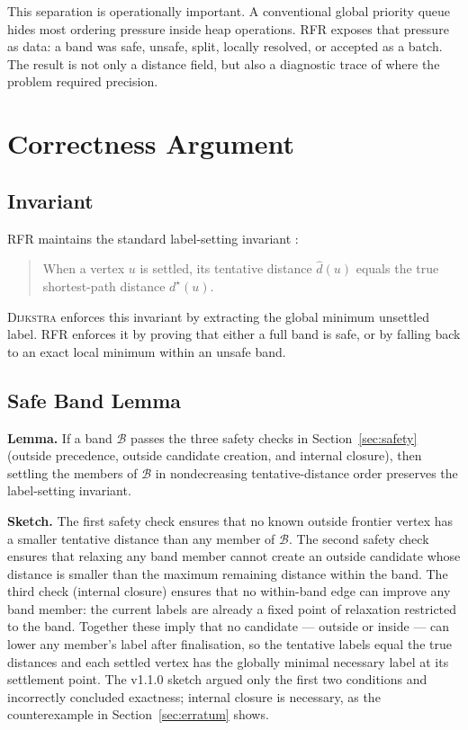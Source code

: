 \documentclass[11pt]{article}
\newcommand{\RFR}{\textsc{RFR}}
\newcommand{\Dijkstra}{\textsc{Dijkstra}}
\newcommand{\band}{\mathcal{B}}
\begin{document}
This separation is operationally important. A conventional global priority queue hides most ordering pressure inside heap operations. \RFR{} exposes that pressure as data: a band was safe, unsafe, split, locally resolved, or accepted as a batch. The result is not only a distance field, but also a diagnostic trace of where the problem required precision.

\section{Correctness Argument}
\label{sec:correctness}

\subsection{Invariant}

\RFR{} maintains the standard label-setting invariant \cite{cormen2009}:

\begin{quote}
When a vertex $u$ is settled, its tentative distance $\hat d(u)$ equals the true shortest-path distance $d^\star(u)$.
\end{quote}

\Dijkstra{} enforces this invariant by extracting the global minimum unsettled label. \RFR{} enforces it by proving that either a full band is safe, or by falling back to an exact local minimum within an unsafe band.

\subsection{Safe Band Lemma}

\textbf{Lemma.} If a band $\band$ passes the three safety checks in Section~\ref{sec:safety} (outside precedence, outside candidate creation, and internal closure), then settling the members of $\band$ in nondecreasing tentative-distance order preserves the label-setting invariant.

\textbf{Sketch.} The first safety check ensures that no known outside frontier vertex has a smaller tentative distance than any member of $\band$. The second safety check ensures that relaxing any band member cannot create an outside candidate whose distance is smaller than the maximum remaining distance within the band. The third check (internal closure) ensures that no within-band edge can improve any band member: the current labels are already a fixed point of relaxation restricted to the band. Together these imply that no candidate --- outside or inside --- can lower any member's label after finalisation, so the tentative labels equal the true distances and each settled vertex has the globally minimal necessary label at its settlement point. The v1.1.0 sketch argued only the first two conditions and incorrectly concluded exactness; internal closure is necessary, as the counterexample in Section~\ref{sec:erratum} shows.
\end{document}
